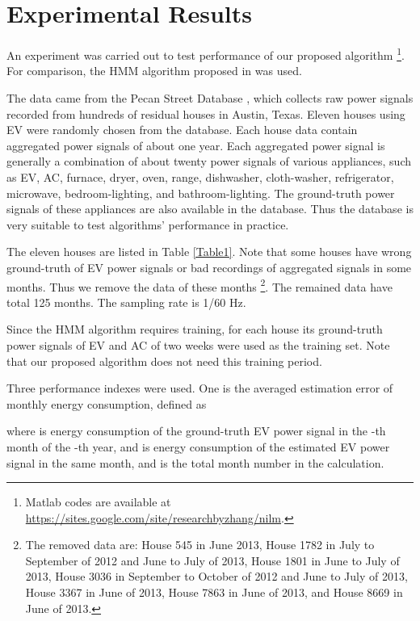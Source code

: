 \documentclass[conference]{IEEEtran}
\begin{document}
\section{Experimental Results}
\label{sec:experiments}

An experiment was carried out to test performance of our proposed algorithm \footnote{Matlab codes are available at \url{https://sites.google.com/site/researchbyzhang/nilm}.}. For comparison, the HMM algorithm proposed in \cite{parson2012non} was used.



The data came from the Pecan Street Database \cite{PecanStreetDatabase}, which collects raw power signals recorded from hundreds of residual houses in Austin, Texas. Eleven houses using EV were randomly chosen from the database. Each house data contain aggregated power signals of about one year. Each aggregated power signal is generally a combination of about twenty power signals of various appliances, such as EV, AC, furnace, dryer, oven, range, dishwasher, cloth-washer, refrigerator, microwave, bedroom-lighting, and bathroom-lighting. The ground-truth power signals of these appliances are also available in the database. Thus the database is very suitable to test algorithms' performance in practice.

The eleven houses are listed in Table \ref{Table1}. Note that some houses have wrong ground-truth of EV power signals or bad recordings of aggregated signals in some months. Thus we remove the data of these months \footnote{The removed data are: House 545 in June 2013, House 1782 in July to September of 2012 and June to July of 2013, House 1801 in June to July of 2013, House 3036 in September to October of 2012 and June to July of 2013, House 3367 in June of 2013, House 7863 in June of 2013, and House 8669 in June of 2013.}. The remained data have total 125 months. The sampling rate is 1/60 Hz.


Since the HMM algorithm requires training, for each house its ground-truth power signals of EV and AC of two weeks were used as the training set. Note that our proposed algorithm does not need this training period.


Three performance indexes were used. One is the averaged estimation error of monthly energy consumption, defined as

where  is energy consumption of the ground-truth EV power signal in the -th month of the -th year, and  is energy consumption of the estimated EV power signal in the same month, and  is the total month number in the calculation.
\end{document}
